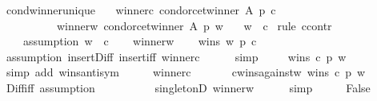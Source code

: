 \begin{isabellebody}
\isanewline
{}\isamarkupfalse%
\ cond{\isacharunderscore}{\kern0pt}winner{\isacharunderscore}{\kern0pt}unique{\isacharcolon}{\kern0pt}\isanewline
\ \ \ winner{\isacharunderscore}{\kern0pt}c{\isacharcolon}{\kern0pt}\ {\isachardoublequoteopen}condorcet{\isacharunderscore}{\kern0pt}winner\ A\ p\ c{\isachardoublequoteclose}\ \isanewline
\ \ \ \ \ \ \ \ \ \ winner{\isacharunderscore}{\kern0pt}w{\isacharcolon}{\kern0pt}\ {\isachardoublequoteopen}condorcet{\isacharunderscore}{\kern0pt}winner\ A\ p\ w{\isachardoublequoteclose}\isanewline
\ \ \ {\isachardoublequoteopen}w\ {\isacharequal}{\kern0pt}\ c{\isachardoublequoteclose}\isanewline
%
\isadelimproof
%
\endisadelimproof
%
\isatagproof
{}\isamarkupfalse%
\ {\isacharparenleft}{\kern0pt}rule\ ccontr{\isacharparenright}{\kern0pt}\isanewline
\ \ \isamarkupfalse%
\isanewline
\ \ \ \ assumption{\isacharcolon}{\kern0pt}\ {\isachardoublequoteopen}w\ {\isasymnoteq}\ c{\isachardoublequoteclose}\isanewline
\ \ \isamarkupfalse%
\ winner{\isacharunderscore}{\kern0pt}w\isanewline
\ \ \isamarkupfalse%
\ {\isachardoublequoteopen}wins\ w\ p\ c{\isachardoublequoteclose}\isanewline
\ \ \ \ \isamarkupfalse%
\ assumption\ insert{\isacharunderscore}{\kern0pt}Diff\ insert{\isacharunderscore}{\kern0pt}iff\ winner{\isacharunderscore}{\kern0pt}c\isanewline
\ \ \ \ \isamarkupfalse%
\ simp\isanewline
\ \ \isamarkupfalse%
\ {\isachardoublequoteopen}{\isasymnot}\ wins\ c\ p\ w{\isachardoublequoteclose}\isanewline
\ \ \ \ \isamarkupfalse%
\ {\isacharparenleft}{\kern0pt}simp\ add{\isacharcolon}{\kern0pt}\ wins{\isacharunderscore}{\kern0pt}antisym{\isacharparenright}{\kern0pt}\isanewline
\ \ \isamarkupfalse%
\ \isamarkupfalse%
\ winner{\isacharunderscore}{\kern0pt}c\isanewline
\ \ \isamarkupfalse%
\isanewline
\ \ \ \ c{\isacharunderscore}{\kern0pt}wins{\isacharunderscore}{\kern0pt}against{\isacharunderscore}{\kern0pt}w{\isacharcolon}{\kern0pt}\ {\isachardoublequoteopen}wins\ c\ p\ w{\isachardoublequoteclose}\isanewline
\ \ \ \ \isamarkupfalse%
\ Diff{\isacharunderscore}{\kern0pt}iff\ assumption\isanewline
\ \ \ \ \ \ \ \ \ \ singletonD\ winner{\isacharunderscore}{\kern0pt}w\isanewline
\ \ \ \ \isamarkupfalse%
\ simp\isanewline
\ \ \isamarkupfalse%
\ \isamarkupfalse%
\ False\isanewline
\ \ \ \ \isamarkupfalse%

\end{isabellebody}
